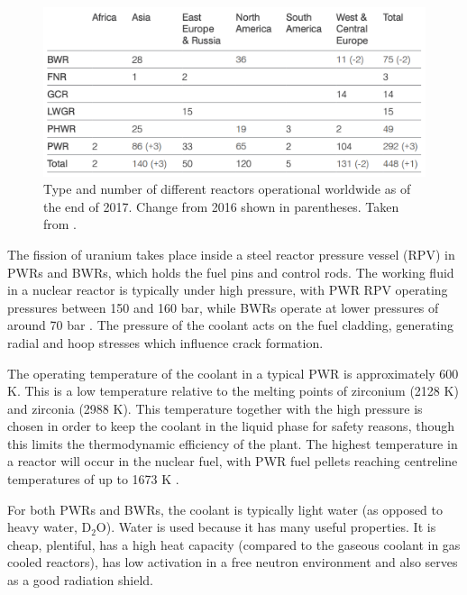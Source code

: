 \begin{figure}[ht] %
\centering
\includegraphics[width=15cm]{images/WNA_report2018.png}
\caption[Type and number of different reactors operational worldwide as of the end of 2017. Change from 2016 shown in parentheses.]{Type and number of different reactors operational worldwide as of the end of 2017. Change from 2016 shown in parentheses. Taken from \cite{WNAreport2018}.}
\label{figure:world_reactors}
\end{figure}

The fission of uranium takes place inside a steel reactor pressure vessel (RPV) in PWRs and BWRs, which holds the fuel pins and control rods. The working fluid in a nuclear reactor is typically under high pressure, with PWR RPV operating pressures between 150 and 160 bar, while BWRs operate at lower pressures of around 70 bar \cite{kok2016nuclear, Server2010, Durmayaz2001}. The pressure of the coolant acts on the fuel cladding, generating radial and hoop stresses which influence crack formation. 

The operating temperature of the coolant in a typical PWR is approximately 600 K. This is a low temperature relative to the melting points of zirconium (2128 K) and zirconia (2988 K). This temperature together with the high pressure is chosen in order to keep the coolant in the liquid phase for safety reasons, though this limits the thermodynamic efficiency of the plant. The highest temperature in a reactor will occur in the nuclear fuel, with PWR fuel pellets reaching centreline temperatures of up to 1673 K \cite{beyer1998review}.

For both PWRs and BWRs, the coolant is typically light water (as opposed to heavy water, D$_{2}$O). Water is used because it has many useful properties. It is cheap, plentiful, has a high heat capacity (compared to the gaseous coolant in gas cooled reactors), has low activation in a free neutron environment and also serves as a good radiation shield. 

